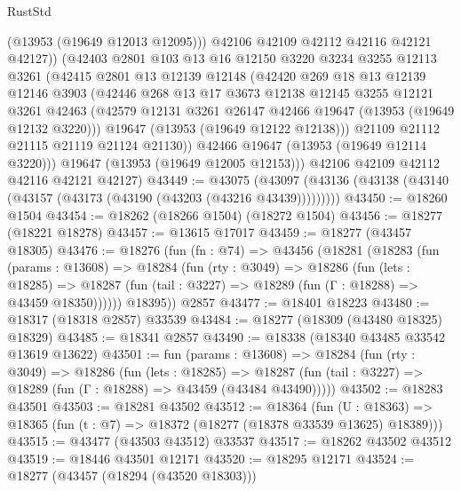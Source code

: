 \begin{lexlean}{RustStd}
\begin{coremodule}
              (@13953 (@19649 @12013 @12095)))
            @42106
            @42109
            @42112
            @42116
            @42121
            @42127))
        (@42403
          @2801
          @103
          @13
          @16
          @12150
          @3220
          @3234
          @3255
          @12113
          @3261
          (@42415
            @2801
            @13
            @12139
            @12148
            (@42420
              @269
              @18
              @13
              @12139
              @12146
              @3903
              (@42446
                @268
                @13
                @17
                @3673
                @12138
                @12145
                @3255
                @12121
                @3261
                @42463
                (@42579 @12131 @3261 @26147 @42466 @19647 (@13953 (@19649 @12132 @3220)))
                @19647
                (@13953 (@19649 @12122 @12138)))
              @21109
              @21112
              @21115
              @21119
              @21124
              @21130))
          @42466
          @19647
          (@13953 (@19649 @12114 @3220)))
        @19647
        (@13953 (@19649 @12005 @12153)))
      @42106
      @42109
      @42112
      @42116
      @42121
      @42127)
@43449 := @43075
    (@43097 (@43136 (@43138 (@43140 (@43157 (@43173 (@43190 (@43203 (@43216 @43439)))))))))
@43450 := @18260 @1504
@43454 := @18262 (@18266 @1504) (@18272 @1504)
@43456 := @18277 (@18221 @18278)
@43457 := @13615 @17017
@43459 := @18277 (@43457 @18305)
@43476 := @18276
    (fun (fn : @74) =>
    @43456
      (@18281
        (@18283
          (fun (params : @13608) =>
          @18284
            (fun (rty : @3049) =>
            @18286
              (fun (lets : @18285) =>
              @18287 (fun (tail : @3227) => @18289 (fun (Γ : @18288) => @43459 @18350))))))
        @18395))
    @2857
@43477 := @18401 @18223
@43480 := @18317 (@18318 @2857) @33539
@43484 := @18277 (@18309 (@43480 @18325) @18329)
@43485 := @18341 @2857
@43490 := @18338 (@18340 @43485 @33542 @13619 @13622)
@43501 := fun (params : @13608) =>
  @18284
    (fun (rty : @3049) =>
    @18286
      (fun (lets : @18285) =>
      @18287 (fun (tail : @3227) => @18289 (fun (Γ : @18288) => @43459 (@43484 @43490)))))
@43502 := @18283 @43501
@43503 := @18281 @43502
@43512 := @18364
    (fun (U : @18363) => @18365 (fun (t : @7) => @18372 (@18277 (@18378 @33539 @13625) @18389)))
@43515 := @43477 (@43503 @43512) @33537
@43517 := @18262 @43502 @43512
@43519 := @18446 @43501 @12171
@43520 := @18295 @12171
@43524 := @18277 (@43457 (@18294 (@43520 @18303)))

\end{coremodule}
\end{lexlean}
